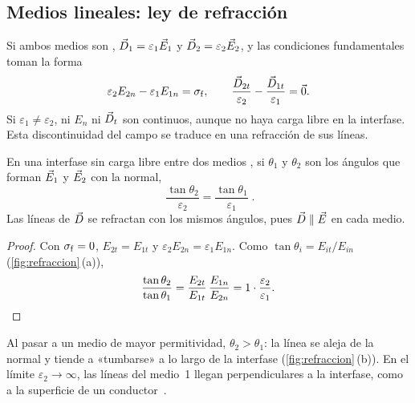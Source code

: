 \subsection{Medios lineales: ley de refracción}\label{sec:refraccion}

Si ambos medios son \LHI{}, $\vec D_1=\varepsilon_1\vec E_1$ y $\vec D_2=\varepsilon_2\vec E_2$, y las condiciones fundamentales toman la forma
\begin{equation}\label{eq:frontera-LHI}
  \varepsilon_2E_{2n}-\varepsilon_1E_{1n}=\sigma_{\mathrm f},\qquad
  \frac{\vec D_{2t}}{\varepsilon_2}-\frac{\vec D_{1t}}{\varepsilon_1}=\vec 0 .
\end{equation}
Si $\varepsilon_1\neq\varepsilon_2$, ni $E_n$ ni $\vec D_t$ son continuos, aunque no haya carga libre en la interfase. Esta discontinuidad del
campo se traduce en una refracción de sus líneas.

\begin{proposicion}\label{prop:refraccion}
En una interfase sin carga libre entre dos medios \LHI{}, si $\theta_1$ y $\theta_2$ son los ángulos que forman $\vec E_1$ y $\vec E_2$ con la
normal,
\begin{equation}\label{eq:refraccion}
  \boxed{\;\frac{\tan\theta_2}{\varepsilon_2}=\frac{\tan\theta_1}{\varepsilon_1}\; .}
\end{equation}
Las líneas de $\vec D$ se refractan con los mismos ángulos, pues $\vec D\parallel\vec E$ en cada medio.
\end{proposicion}

\begin{proof}
Con $\sigma_{\mathrm f}=0$, $E_{2t}=E_{1t}$ y $\varepsilon_2E_{2n}=\varepsilon_1E_{1n}$. Como $\tan\theta_i=E_{it}/E_{in}$ (\cref{fig:refraccion}\,(a)),
\[
  \frac{\tan\theta_2}{\tan\theta_1}=\frac{E_{2t}}{E_{1t}}\,\frac{E_{1n}}{E_{2n}}=1\cdot\frac{\varepsilon_2}{\varepsilon_1}. \qedhere
\]
\end{proof}

Al pasar a un medio de mayor permitividad, $\theta_2>\theta_1$: la línea se aleja de la normal y tiende a «tumbarse» a lo largo
de la interfase (\cref{fig:refraccion}\,(b)). En el límite $\varepsilon_2\to\infty$, las líneas del medio~1 llegan perpendiculares a la
interfase, como a la superficie de un conductor~\cite{T3}.



